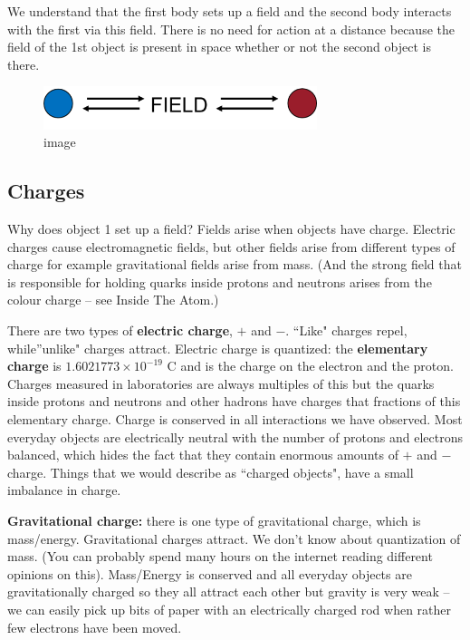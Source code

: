\documentclass[
]{book}
\begin{document}
We understand that the first body sets up a field and the second body
interacts with the first via this field. There is no need for action at
a distance because the field of the 1st object is present in space
whether or not the second object is there.

\begin{figure}
\centering
\includegraphics[width=80mm,height=\textheight]{Figures/blue_red_FIELD.png}
\caption{image}
\end{figure}

\hypertarget{charges}{%
\subsection{Charges}\label{charges}}

Why does object 1 set up a field? Fields arise when objects have charge.
Electric charges cause electromagnetic fields, but other fields arise
from different types of charge for example gravitational fields arise
from mass. (And the strong field that is responsible for holding quarks
inside protons and neutrons arises from the colour charge -- see Inside
The Atom.)

There are two types of \textbf{electric charge}, \(+\) and \(-\). ``Like" charges
repel, while''unlike" charges attract. Electric charge is quantized:
the \textbf{elementary charge} is \(1.6021773 \times 10^{-19}\) C and is the
charge on the electron and the proton. Charges measured in laboratories
are always multiples of this but the quarks inside protons and neutrons
and other hadrons have charges that fractions of this elementary charge.
Charge is conserved in all interactions we have observed. Most everyday
objects are electrically neutral with the number of protons and
electrons balanced, which hides the fact that they contain enormous
amounts of \(+\) and \(-\) charge. Things that we would describe as ``charged
objects", have a small imbalance in charge.

\textbf{Gravitational charge:} there is one type of gravitational charge,
which is mass/energy. Gravitational charges attract. We don't know about
quantization of mass. (You can probably spend many hours on the internet
reading different opinions on this). Mass/Energy is conserved and all
everyday objects are gravitationally charged so they all attract each
other but gravity is very weak -- we can easily pick up bits of paper
with an electrically charged rod when rather few electrons have been
moved.
\end{document}
